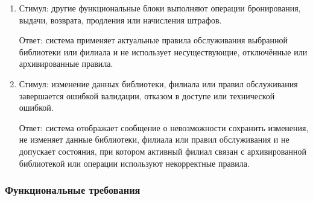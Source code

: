 \documentclass[12pt,a4paper]{article}
\begin{document}
\begin{enumerate}
		Ответ: система запрашивает подтверждение изменения, позволяет указать
		комментарий, сохраняет новую версию правил, дату начала действия, прежние
		значения и запись о подтверждении в журнале аудита.
		
		\item Стимул: другие функциональные блоки выполняют операции бронирования,
		выдачи, возврата, продления или начисления штрафов.
		
		Ответ: система применяет актуальные правила обслуживания выбранной библиотеки
		или филиала и не использует несуществующие, отключённые или архивированные
		правила.
		
		\item Стимул: изменение данных библиотеки, филиала или правил обслуживания
		завершается ошибкой валидации, отказом в доступе или технической ошибкой.
		
		Ответ: система отображает сообщение о невозможности сохранить изменения,
		не изменяет данные библиотеки, филиала или правил обслуживания и не допускает
		состояния, при котором активный филиал связан с архивированной библиотекой
		или операции используют некорректные правила.
	\end{enumerate}
	
	\subsubsection{Функциональные требования}
	
\end{document}
